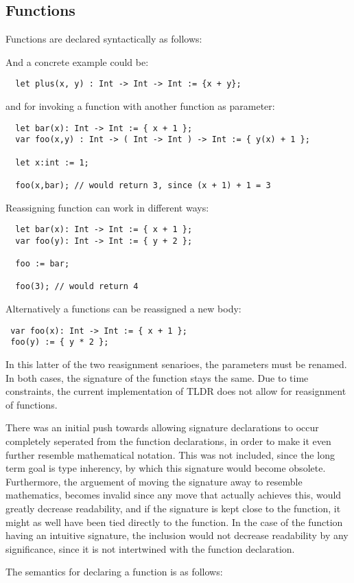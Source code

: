 \subsection{Functions}
\label{subsec:functions}
Functions are declared syntactically as follows:

And a concrete example could be:

\begin{verbatim}
  let plus(x, y) : Int -> Int -> Int := {x + y};
\end{verbatim}

and for invoking a function with another function as parameter:

\begin{verbatim}
  let bar(x): Int -> Int := { x + 1 };
  var foo(x,y) : Int -> ( Int -> Int ) -> Int := { y(x) + 1 };

  let x:int := 1;

  foo(x,bar); // would return 3, since (x + 1) + 1 = 3
\end{verbatim}

Reassigning function can work in different ways:

\begin{verbatim}
  let bar(x): Int -> Int := { x + 1 };
  var foo(y): Int -> Int := { y + 2 };

  foo := bar;

  foo(3); // would return 4
\end{verbatim}

Alternatively a functions can be reassigned a new body:

\begin{verbatim}
 var foo(x): Int -> Int := { x + 1 };
 foo(y) := { y * 2 };
\end{verbatim}

In this latter of the two reasignment senarioes, the parameters must be renamed. In both cases, the signature of the function stays the same. Due to time constraints, the current implementation of TLDR does not allow for reasignment of functions.

There was an initial push towards allowing signature declarations to occur completely seperated from the function declarations, in order to make it even further resemble mathematical notation. This was not included, since the long term goal is type inherency, by which this signature would become obsolete. Furthermore, the arguement of moving the signature away to resemble mathematics, becomes invalid since any move that actually achieves this, would greatly decrease readability, and if the signature is kept close to the function, it might as well have been tied directly to the function. In the case of the function having an intuitive signature, the inclusion would not decrease readability by any significance, since it is not intertwined with the function declaration.

The semantics for declaring a function is as follows: